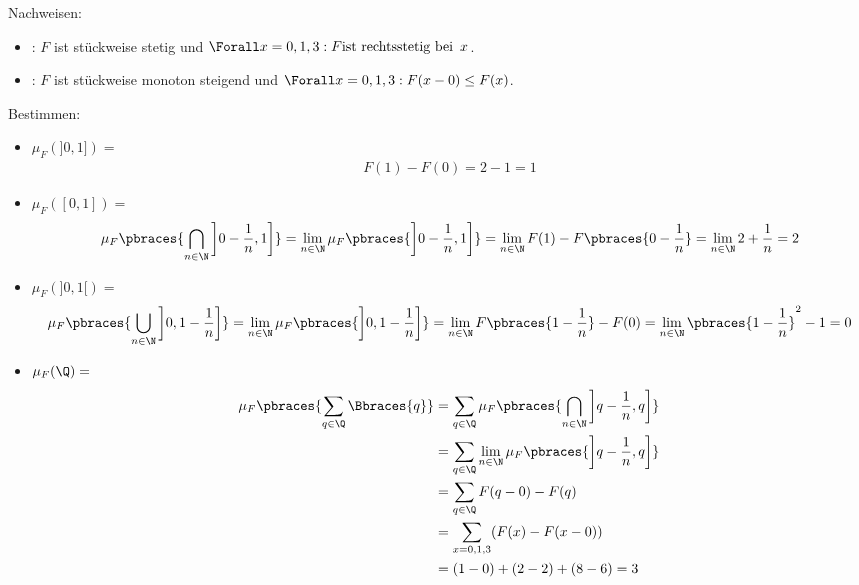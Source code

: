 \begin{solution}

Nachweisen:

\begin{itemize}

  \item {}: $F$ ist stückweise stetig und $\Forall x = 0, 1, 3: F \text{ist rechtsstetig bei} \enspace x$.

  \item {}: $F$ ist stückweise monoton steigend und $\Forall x = 0, 1, 3: F(x - 0) \leq F(x)$.

\end{itemize}

Bestimmen:

\begin{itemize}

  \item $\mu_F(]0, 1]) =$
  \begin{align*}
    F(1) - F(0) = 2 - 1 = 1
  \end{align*}

  \item $\mu_F([0, 1]) =$
  \begin{align*}
    \mu_F \pbraces{\bigcap_{n \in \N} \left ] 0 - \frac{1}{n}, 1 \right]}
    =
    \lim_{n \in \N} \mu_F \pbraces{ \left ] 0 - \frac{1}{n}, 1 \right]}
    =
    \lim_{n \in \N} F(1) - F \pbraces{0 - \frac{1}{n}}
    =
    \lim_{n \in \N} 2 + \frac{1}{n} = 2
  \end{align*}

  \item $\mu_F(]0, 1[) =$
  \begin{align*}
    \mu_F \pbraces{\bigcup_{n \in \N} \left ] 0, 1 - \frac{1}{n} \right ]}
    =
    \lim_{n \in \N} \mu_F \pbraces{\left ] 0, 1 - \frac{1}{n} \right ]}
    =
    \lim_{n \in \N} F \pbraces{1 - \frac{1}{n}} - F(0)
    =
    \lim_{n \in \N} \pbraces{1 - \frac{1}{n}}^2 - 1 = 0
  \end{align*}

  \item $\mu_F(\Q) =$
  \begin{align*}
    \mu_F \pbraces{\sum_{q \in \Q} \Bbraces{q}}
    & =
    \sum_{q \in \Q} \mu_F \pbraces
    {\bigcap_{n \in \N} \left ] q - \frac{1}{n}, q \right ]} \\
    & =
    \sum_{q \in \Q} \lim_{n \in \N} \mu_F \pbraces
    {\left ] q - \frac{1}{n}, q \right ]} \\
    & =
    \sum_{q \in \Q} F(q - 0) - F(q) \\
    & =
    \sum_{x = 0, 1, 3} (F(x) - F(x - 0)) \\
    & =
    (1 - 0) + (2 - 2) + (8 - 6) = 3
  \end{align*}

\end{itemize}

\end{solution}

